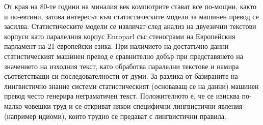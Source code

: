 \begin{multicols}{2}
  От края на 80-те години на миналия век компютрите стават все по-мощни, както и по-евтини, затова интересът към статистическите модели за машинен превод се засилва. Статистическите модели се извличат
   след анализ на двуезични текстови корпуси като
   паралелния корпус Europarl със стенограми на
   Европейския парламент на 21 европейски езика. При наличието на достатъчно данни статистическият машинен превод е сравнително добър при представянето на значението на изходния текст, като обработва паралелни текстове и намира съответстващи си последователности от думи. За разлика от базираните на лингвистично знание системи статистическият (основаващ се на данни) машинен превод често генерира неграматичен текст. Положителното е, че се изисква по-малко човешки труд и се откриват някои специфични лингвистични явления (например идиоми), които трудно се предават с лингвистични правила. 



\end{multicols}
